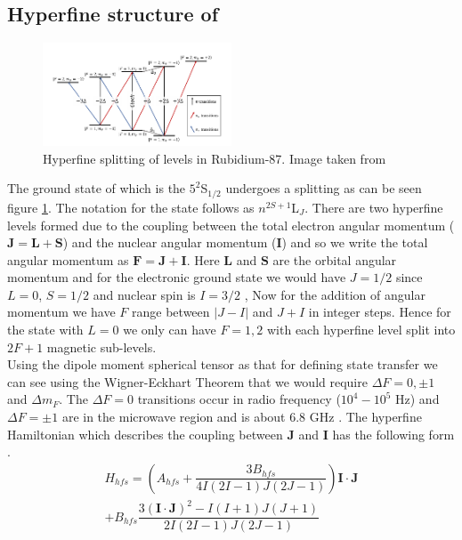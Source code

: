 \documentclass[%
 reprint,
 amsmath,amssymb,
 aps,
]{revtex4-2}
\begin{document}
\subsection{Hyperfine structure of }
\begin{figure}[ht]
    \centering
    \includegraphics[width=0.5\textwidth]{images/hyperfine.png}
    \caption{Hyperfine splitting of levels in Rubidium-87. Image taken from \cite{microwavejoslin}}
    \label{fig:1}
\end{figure}
The ground state of  which is the $5^2$S$_{1/2}$ undergoes a splitting as can be seen figure \ref{fig:1}. The notation for the state follows as $n^{2S+1}$L$_{J}$. There are two hyperfine levels formed due to the coupling between the total electron angular momentum ($\textbf{J} = \textbf{L} + \textbf{S}$) and the nuclear angular momentum ($\textbf{I}$) and so we write the total angular momentum as $\textbf{F} = \textbf{J} + \textbf{I}$. Here $\textbf{L}$ and $\textbf{S}$ are the orbital angular momentum and for the electronic ground state we would have $J = 1/2$ since $L=0$, $S = 1/2$ and nuclear spin is $I = 3/2$ \cite{pubchem-rb87}, Now for the addition of angular momentum we have $F$ range between $|J-I|$ and $J + I$ in integer steps. Hence for the state with $L = 0$ we only can have $F = 1,2$ with each hyperfine level split into $2F+1$ magnetic sub-levels.\\
Using the dipole moment spherical tensor as that for defining state transfer we can see using the Wigner-Eckhart Theorem \cite{book:17486} that we would require $\Delta F = 0,\pm1$ and $\Delta m_F$. The $\Delta F=0$ transitions occur in radio frequency ($10^4-10^5$ Hz) and $\Delta F = \pm1$ are in the microwave region and is about 6.8 GHz \cite{microwavejoslin}. The hyperfine Hamiltonian which describes the coupling between $\textbf{J}$ and $\textbf{I}$ has the following form \cite{rb87dline}.
\begin{eqnarray}
    \label{eq:1}H_{hfs} = \left(A_{hfs} + \dfrac{3B_{hfs}}{4I(2I-1)J(2J-1)}\right)\textbf{I}\cdot\textbf{J}
    \nonumber\\+ B_{hfs}\dfrac{3(\textbf{I}\cdot\textbf{J})^2 - I(I+1)J(J+1)}{2I(2I-1)J(2J-1)}
\end{eqnarray}
\end{document}
